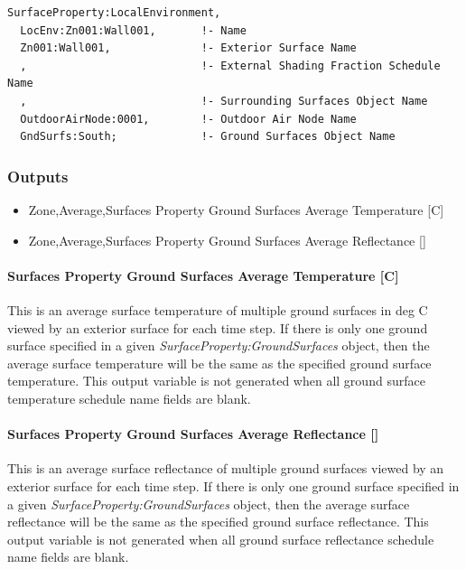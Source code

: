 \begin{lstlisting}
SurfaceProperty:LocalEnvironment,
  LocEnv:Zn001:Wall001,       !- Name
  Zn001:Wall001,              !- Exterior Surface Name
  ,                           !- External Shading Fraction Schedule Name
  ,                           !- Surrounding Surfaces Object Name
  OutdoorAirNode:0001,        !- Outdoor Air Node Name
  GndSurfs:South;             !- Ground Surfaces Object Name
\end{lstlisting}

\subsubsection{Outputs}\label{outputs-gndSrfs}

\begin{itemize}
\item
  Zone,Average,Surfaces Property Ground Surfaces Average Temperature {[}C{]}
\item
  Zone,Average,Surfaces Property Ground Surfaces Average Reflectance {[]}
\end{itemize}

\paragraph{Surfaces Property Ground Surfaces Average Temperature {[}C{]}}\label{surfaces-property-ground-surfaces-average-temperature}

This is an average surface temperature of multiple ground surfaces in deg C viewed by an exterior surface for each time step. If there is only one ground surface specified in a given \textit{SurfaceProperty:GroundSurfaces} object, then the average surface temperature will be the same as the specified ground surface temperature. This output variable is not generated when all ground surface temperature schedule name fields are blank.

\paragraph{Surfaces Property Ground Surfaces Average Reflectance {[]}}\label{surfaces-property-ground-surfaces-average-reflectance}

This is an average surface reflectance of multiple ground surfaces viewed by an exterior surface for each time step. If there is only one ground surface specified in a given \textit{SurfaceProperty:GroundSurfaces} object, then the average surface reflectance will be the same as the specified ground surface reflectance. This output variable is not generated when all ground surface reflectance schedule name fields are blank.

